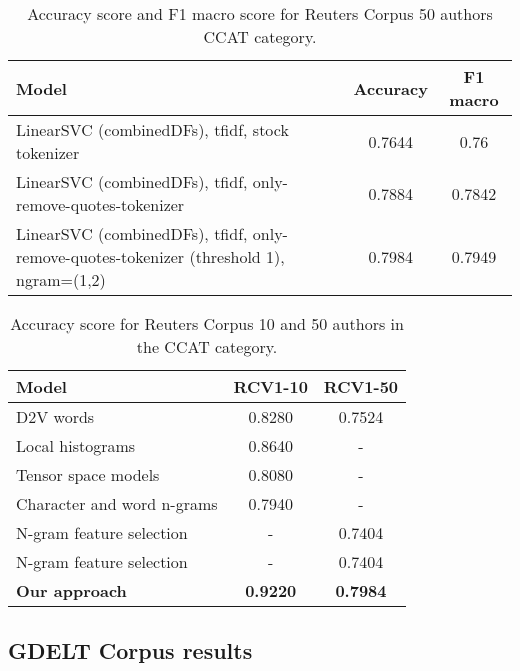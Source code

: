 \begin{table}[h!]
	\begin{center}  
		\caption[Reuters Corpus Results - 50 authors]{Accuracy score and F1 macro score for Reuters Corpus 50 authors CCAT category.} 
		\label{tab:tableRCV1_50}
		\begin{tabular}{| p{5 cm} | c | c |}
			\hline 
			Model & Accuracy & F1 macro \\
			\hline
			LinearSVC (combinedDFs), tfidf, stock tokenizer & 0.7644 & 0.76 \\ \hline
			LinearSVC (combinedDFs), tfidf, only-remove-quotes-tokenizer & 0.7884 & 0.7842 \\ \hline
			LinearSVC (combinedDFs), tfidf, only-remove-quotes-tokenizer (threshold 1),
			ngram=(1,2) & 0.7984 & 0.7949 \\ \hline
		\end{tabular} 
	\end{center}
\end{table}


\begin{table}[h!]
	\begin{center}  
		\caption[Reuters Corpus Benchmark - 10 and 50 authors]{Accuracy score for Reuters Corpus 10 and 50 authors in the CCAT category.} 
		\label{tab:tableRCV1_10_benchmark}
		\begin{tabular}{| p{5 cm} | c | c |}
			\hline 
			Model & RCV1-10 & RCV1-50 \\
			\hline
			D2V words & 0.8280 & 0.7524 \\ \hline
			Local histograms & 0.8640 & - \\ \hline
			Tensor space models & 0.8080 & - \\ \hline
			Character and word n-grams & 0.7940 & - \\ \hline
			N-gram feature selection & - & 0.7404 \\ \hline
			N-gram feature selection & - & 0.7404 \\ \hline
			\textbf{Our approach} & \textbf{0.9220} & \textbf{0.7984} \\ \hline
		\end{tabular} 
	\end{center}
\end{table}


\subsection{GDELT Corpus results}

